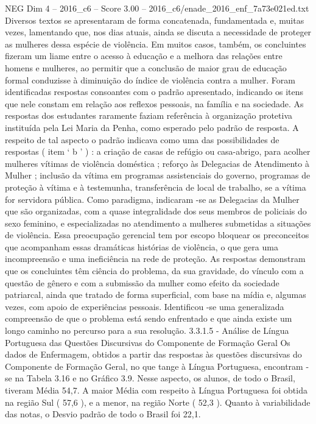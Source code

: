 \begin{textsample}{NEG Dim 4 – 2016\_c6 – Score 3.00 – 2016\_c6/enade\_2016\_enf\_7a73e021ed.txt}
Diversos textos se apresentaram de forma concatenada, fundamentada e, muitas vezes, lamentando que, nos dias atuais, ainda se discuta a necessidade de proteger as mulheres dessa espécie de violência.
Em muitos casos, também, os concluintes fizeram um liame entre o acesso à educação e a melhora das relações entre homens e mulheres, ao permitir que a conclusão de maior grau de educação formal conduzisse à diminuição do índice de violência contra a mulher.
Foram identificadas respostas consoantes com o padrão apresentado, indicando os itens que nele constam em relação aos reflexos pessoais, na família e na sociedade.
As respostas dos estudantes raramente faziam referência à organização protetiva instituída pela Lei Maria da Penha, como esperado pelo padrão de resposta.
A respeito de tal aspecto o padrão indicava como uma das possibilidades de respostas ( item ‘ b ’ ) : a criação de casas de refúgio ou casa-abrigo, para acolher mulheres vítimas de violência doméstica ; reforço às Delegacias de Atendimento à Mulher ; inclusão da vítima em programas assistenciais do governo, programas de proteção à vítima e à testemunha, transferência de local de trabalho, se a vítima for servidora pública.
Como paradigma, indicaram -se as Delegacias da Mulher que são organizadas, com a quase integralidade dos seus membros de policiais do sexo feminino, e especializadas no atendimento a mulheres submetidas a situações de violência.
Essa preocupação gerencial tem por escopo bloquear os preconceitos que acompanham essas dramáticas histórias de violência, o que gera uma incompreensão e uma ineficiência na rede de proteção.
As respostas demonstram que os concluintes têm ciência do problema, da sua gravidade, do vínculo com a questão de gênero e com a submissão da mulher como efeito da sociedade patriarcal, ainda que tratado de forma superficial, com base na mídia e, algumas vezes, com apoio de experiências pessoais.
Identificou -se uma generalizada compreensão de que o problema está sendo enfrentado e que ainda existe um longo caminho no percurso para a sua resolução. 3.3.1.5 - Análise de Língua Portuguesa das Questões Discursivas do Componente de Formação Geral Os dados de Enfermagem, obtidos a partir das respostas às questões discursivas do Componente de Formação Geral, no que tange à Língua Portuguesa, encontram -se na Tabela 3.16 e no Gráfico 3.9.
Nesse aspecto, os alunos, de todo o Brasil, tiveram Média 54,7.
A maior Média com respeito à Língua Portuguesa foi obtida na região Sul ( 57,6 ), e a menor, na região Norte ( 52,3 ).
Quanto à variabilidade das notas, o Desvio padrão de todo o Brasil foi 22,1.

\end{textsample}
